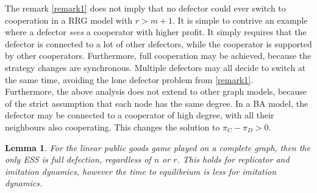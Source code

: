 The remark \ref{remark1} does not imply that no defector could ever switch to cooperation in a RRG model with $r>m+1$. It is simple to contrive an example where a defector \emph{sees} a cooperator with higher profit. It simply requires that the defector is connected to a lot of other defectors, while the cooperator is supported by other cooperators. Furthermore, full cooperation may be achieved, because the strategy changes are synchronous. Multiple defectors may all decide to switch at the same time, avoiding the lone defector problem from \ref{remark1}. \\

Furthermore, the above analysis does not extend to other graph models, because of the strict assumption that each node has the same degree. In a BA model, the defector may be connected to a cooperator of high degree, with all their neighbours also cooperating. This changes the solution to $\pi_C - \pi_D>0$. \\
\FloatBarrier
\newtheorem{lemma_connected}[theorem]{Lemma} \label{connected}
\begin{lemma_connected}
For the linear public goods game played on a complete graph, then the only ESS is full defection, regardless of $n$ or $r$. This holds for replicator and imitation dynamics, however the time to equilibrium is less for imitation dynamics.  \end{lemma_connected}
